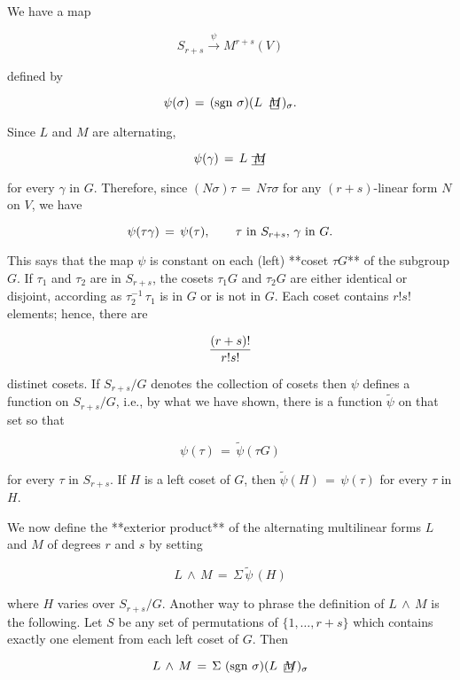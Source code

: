 We have a map

\[S_{r+s}\mathop{\to}\limits^{\psi}M^{r+s}(V)\]

defined by

\[\psi(\sigma)\,=\,(\mathop{\rm sgn}\,\sigma)(L\,\,\hbox to 0.0pt{\lower 2.15pt\hbox{ \vbox{\hrule height 0.4pt\hbox{\vrule width 0.4pt height 6.0pt\kern 6.0pt\vrule width 0.4pt}\hrule height 0.4pt}}}\,M)_{ \sigma}.\]

Since \(L\) and \(M\) are alternating,

\[\psi(\gamma)\,=\,L\,\,\hbox to 0.0pt{\lower 2.15pt\hbox{\vbox{\hrule height 0.4pt\hbox{ \vrule width 0.4pt height 6.0pt\kern 6.0pt\vrule width 0.4pt}\hrule height 0.4pt}}}\,M\]

for every \(\gamma\) in \(G\). Therefore, since \((N\sigma)\tau\,=\,N\tau\sigma\) for any \((r+s)\)-linear form \(N\) on \(V\), we have

\[\psi(\tau\gamma)\,=\,\psi(\tau),\qquad\tau\,\,\hbox{in}\,\,S_{r+s},\,\gamma\, \,\hbox{in}\,\,G.\]

This says that the map \(\psi\) is constant on each (left) **coset \(\tau G\)** of the subgroup \(G\). If \(\tau_{1}\) and \(\tau_{2}\) are in \(S_{r+s}\), the cosets \(\tau_{1}G\) and \(\tau_{2}G\) are either identical or disjoint, according as \(\tau_{2}^{-1}\,\tau_{1}\) is in \(G\) or is not in \(G\). Each coset contains \(r!s!\) elements; hence, there are

\[{(r+s)!\over r!s!}\]

distinet cosets. If \(S_{r+s}/G\) denotes the collection of cosets then \(\psi\) defines a function on \(S_{r+s}/G\), i.e., by what we have shown, there is a function \(\tilde{\psi}\) on that set so that

\[\psi(\tau)\,=\,\tilde{\psi}(\tau G)\]

for every \(\tau\) in \(S_{r+s}\). If \(H\) is a left coset of \(G\), then \(\tilde{\psi}(H)\,=\,\psi(\tau)\) for every \(\tau\) in \(H\).

We now define the **exterior product** of the alternating multilinear forms \(L\) and \(M\) of degrees \(r\) and \(s\) by setting

\[L\,\wedge\,M\,=\,\Sigma\,\tilde{\psi}\,(H)\]

where \(H\) varies over \(S_{r+s}/G\). Another way to phrase the definition of \(L\,\wedge\,M\) is the following. Let \(S\) be any set of permutations of \(\{1,\ldots,r+s\}\) which contains exactly one element from each left coset of \(G\). Then

\[L\,\wedge\,M\,=\,\Sigma\,\,(\mathop{\rm sgn}\,\sigma)(L\,\,\hbox to 0.0pt{ \lower 2.15pt\hbox{\vbox{\hrule height 0.4pt\hbox{\vrule width 0.4pt height 6.0pt\kern 6.0pt\vrule width 0.4pt}\hrule height 0.4pt}}}\,M)_{ \sigma}\]

